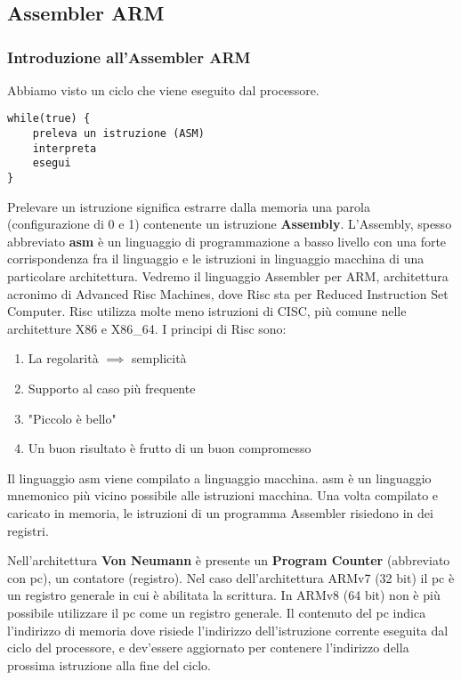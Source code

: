\part{}
\chapter{Assembler ARM}

\section{Introduzione all'Assembler ARM}

Abbiamo visto un ciclo che viene eseguito dal processore.
\begin{lstlisting}
while(true) {
	preleva un istruzione (ASM)
	interpreta
	esegui
}
\end{lstlisting} 

\begin{defn}
Prelevare un istruzione significa estrarre dalla memoria una parola (configurazione di 0 e 1) contenente un istruzione \textbf{Assembly}. L'Assembly, spesso abbreviato \textbf{asm} è un linguaggio di programmazione a basso livello con una forte corrispondenza fra il linguaggio e le istruzioni in linguaggio macchina di una particolare architettura. Vedremo il linguaggio Assembler per ARM, architettura acronimo di Advanced Risc Machines, dove Risc sta per Reduced Instruction Set Computer. Risc utilizza molte meno istruzioni di CISC, più comune nelle architetture X86 e X86\_64. I principi di Risc sono:
\begin{enumerate}
	\item La regolarità $ \implies $ semplicità
	\item Supporto al caso più frequente
	\item "Piccolo è bello"
	\item Un buon risultato è frutto di un buon compromesso
\end{enumerate}

Il linguaggio asm viene compilato a linguaggio macchina. asm è un linguaggio mnemonico più vicino possibile alle istruzioni macchina. Una volta compilato e caricato in memoria, le istruzioni di un programma Assembler risiedono in dei registri.
\end{defn}

\begin{defn}
Nell'architettura \textbf{Von Neumann} è presente un \textbf{Program Counter} (abbreviato con pc), un contatore (registro). Nel caso dell'architettura ARMv7 (32 bit) il pc è un registro generale in cui è abilitata la scrittura. In ARMv8 (64 bit) non è più possibile utilizzare il pc come un registro generale. Il contenuto del pc indica l'indirizzo di memoria dove risiede l'indirizzo dell'istruzione corrente eseguita dal ciclo del processore, e dev'essere aggiornato per contenere l'indirizzo della prossima istruzione alla fine del ciclo.
\end{defn}

